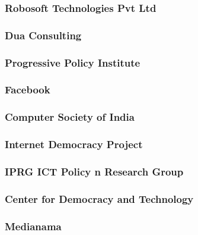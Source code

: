 \documentclass{article}
\begin{document}
\subsubsection{Robosoft Technologies Pvt Ltd}


\subsubsection{Dua Consulting}


\subsubsection{Progressive Policy Institute}


\subsubsection{Facebook}


\subsubsection{Computer Society of India}


\subsubsection{Internet Democracy Project}


\subsubsection{IPRG ICT Policy n Research Group}


\subsubsection{Center for Democracy and Technology}


\subsubsection{Medianama}

\end{document}
